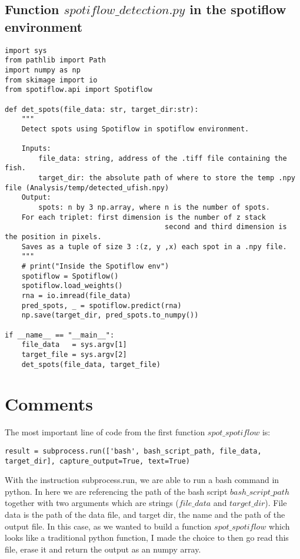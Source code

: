 \documentclass[24pt]{article}
\begin{document}
\subsection{Function $spotiflow\_detection.py$ in the spotiflow environment}
\begin{lstlisting}
import sys
from pathlib import Path
import numpy as np
from skimage import io
from spotiflow.api import Spotiflow

def det_spots(file_data: str, target_dir:str):
    """
    Detect spots using Spotiflow in spotiflow environment.
    
    Inputs:
        file_data: string, address of the .tiff file containing the fish.
        target_dir: the absolute path of where to store the temp .npy file (Analysis/temp/detected_ufish.npy)
    Output:
        spots: n by 3 np.array, where n is the number of spots.
    For each triplet: first dimension is the number of z stack
                                      second and third dimension is the position in pixels.
    Saves as a tuple of size 3 :(z, y ,x) each spot in a .npy file.
    """
    # print("Inside the Spotiflow env")
    spotiflow = Spotiflow()
    spotiflow.load_weights()    
    rna = io.imread(file_data)
    pred_spots, _ = spotiflow.predict(rna)
    np.save(target_dir, pred_spots.to_numpy())
    
if __name__ == "__main__": 
    file_data   = sys.argv[1] 
    target_file = sys.argv[2]
    det_spots(file_data, target_file)
\end{lstlisting}

\newpage
\section{Comments}

The most important line of code from the first function $spot\_spotiflow$ is:

\begin{lstlisting}
result = subprocess.run(['bash', bash_script_path, file_data,  target_dir], capture_output=True, text=True)
\end{lstlisting}

With the instruction subprocess.run, we are able to run a bash command in python. In here we are referencing the path of the bash script $bash\_script\_path$ together with two arguments which are strings ($file\_data$ and $target\_dir$). File data is the path of the data file, and target dir, the name and the  path of the output file. In this case, as we wanted to build a function $spot\_spotiflow$ which looks like a traditional python function, I made the choice to then go read this file, erase it and return the output as an numpy array. 
\end{document}
